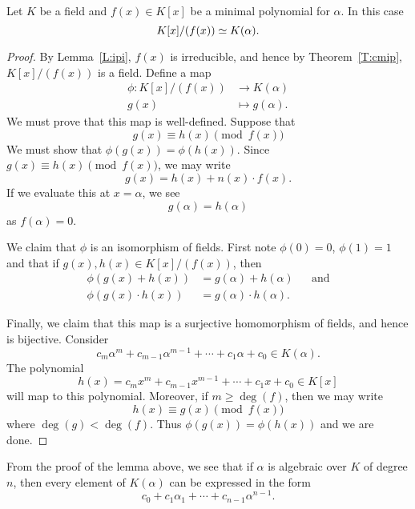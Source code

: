\documentclass{ximera}
\begin{document}
\begin{lemma}
  Let $K$ be a field and $f(x)\in K[x]$ be a minimal polynomial for
  $\alpha$. In this case
  \[
  K[x]/(f(x))\simeq K(\alpha). 
  \]
  \begin{proof}
    By Lemma~\ref{L:ipi}, $f(x)$ is irreducible, and hence by
    Theorem~\ref{T:cmip}, $K[x]/(f(x))$ is a field. Define a map
    \begin{align*}
    \phi:K[x]/(f(x)) &\to K(\alpha)\\
    g(x) &\mapsto g(\alpha).
    \end{align*}
    We must prove that this map is well-defined.
    Suppose that
    \[
    g(x) \equiv h(x) \pmod{f(x)}
    \]
    We must show that $\phi(g(x)) = \phi(h(x))$. Since $g(x) \equiv
    h(x) \pmod{f(x)}$, we may write
    \[
    g(x) = h(x) + n(x) \cdot f(x).
    \]
    If we evaluate this at $x= \alpha$, we see
    \[
    g(\alpha) = h(\alpha)
    \]
    as $f(\alpha) = 0$.

    We claim that $\phi$ is an isomorphism of fields. First note
    $\phi(0) = 0$, $\phi(1) = 1$ and that if $g(x),h(x)\in
    K[x]/(f(x))$, then
    \begin{align*}
      \phi(g(x) + h(x)) &= g(\alpha) + h(\alpha) & &\text{and}\\
      \phi(g(x) \cdot h(x)) &= g(\alpha)\cdot h(\alpha). & &
    \end{align*}


    Finally, we claim that this map is a surjective homomorphism of
    fields, and hence is bijective. Consider
    \[
    c_m\alpha^m + c_{m-1}\alpha^{m-1} + \cdots + c_1\alpha + c_0\in
    K(\alpha).
    \]
    The polynomial
    \[
    h(x) = c_m x^m + c_{m-1} x^{m-1} + \cdots + c_1x  + c_0\in
    K[x]
    \]
    will map to this polynomial. Moreover, if $m\ge \deg(f)$, then
    we may write
    \[
    h(x) \equiv g(x) \pmod{f(x)}
    \]
    where $\deg(g)< \deg(f)$. Thus $\phi(g(x)) =\phi(h(x))$ and
    we are done.
  \end{proof}
\end{lemma}


\begin{remark}
From the proof of the lemma above, we see that if $\alpha$ is
algebraic over $K$ of degree $n$, then every element of $K(\alpha)$ can be
expressed in the form
\[
c_0 + c_1\alpha_1 + \cdots + c_{n-1}\alpha^{n-1}.
\]
\end{remark}
\end{document}
